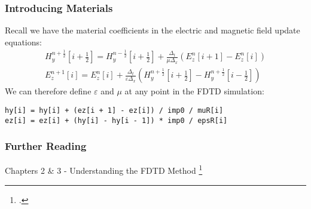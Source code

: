 \documentclass[10pt]{beamer}
\newcommand{\E}{\varepsilon}  %
\renewcommand{\u}{\mu}  %
\begin{document}
\begin{frame}[fragile]
    \frametitle{Introducing Materials}
 Recall we have the material coefficients in the electric and magnetic field update equations:
 \begin{align*}
    H_y^{n+\frac{1}{2}}\left[i+\frac{1}{2}\right] = H_y^{n-\frac{1}{2}}\left[i+\frac{1}{2}\right] +
    \frac{\Delta_t}{\u\Delta_x}
    \left(E_z^{n}\left[i+1\right] - E_z^{n}\left[i\right]\right) \\
    E_z^{n+1}\left[i\right] = E_z^{n}\left[i\right] +
    \frac{\Delta_t}{\E\Delta_x}
    \left(H_y^{n+\frac{1}{2}}\left[i+\frac{1}{2}\right] - H_y^{n+\frac{1}{2}}\left[i-\frac{1}{2}\right]\right)
 \end{align*}
    We can therefore define $\E$ and $\u$ at any point in the FDTD simulation:
    \begin{verbatim}
hy[i] = hy[i] + (ez[i + 1] - ez[i]) / imp0 / muR[i]
ez[i] = ez[i] + (hy[i] - hy[i - 1]) * imp0 / epsR[i]
    \end{verbatim}

\end{frame}

\begin{frame}
    \frametitle{Further Reading}

    Chapters 2 \& 3 - Understanding the FDTD Method \footcite{schneider_understanding_nodate}
  


\end{frame}





\end{document}
